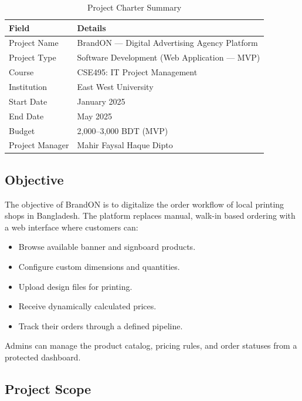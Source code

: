 \documentclass[12pt,a4paper]{report}
\begin{document}
\begin{table}[H]
  \centering
  \caption{Project Charter Summary}
  \begin{tabularx}{\textwidth}{L{3.5cm} X}
    \toprule
    \textbf{Field} & \textbf{Details} \\
    \midrule
    Project Name    & BrandON --- Digital Advertising Agency Platform \\
    Project Type    & Software Development (Web Application --- MVP) \\
    Course          & CSE495: IT Project Management \\
    Institution     & East West University \\
    Start Date      & January 2025 \\
    End Date        & May 2025 \\
    Budget          & 2,000--3,000 BDT (MVP) \\
    Project Manager & Mahir Faysal Haque Dipto \\
    \bottomrule
  \end{tabularx}
\end{table}

\subsection{Objective}

The objective of BrandON is to digitalize the order workflow of local printing shops in Bangladesh. The platform replaces manual, walk-in based ordering with a web interface where customers can:
\begin{itemize}
  \item Browse available banner and signboard products.
  \item Configure custom dimensions and quantities.
  \item Upload design files for printing.
  \item Receive dynamically calculated prices.
  \item Track their orders through a defined pipeline.
\end{itemize}

Admins can manage the product catalog, pricing rules, and order statuses from a protected dashboard.

\subsection{Project Scope}
\end{document}
